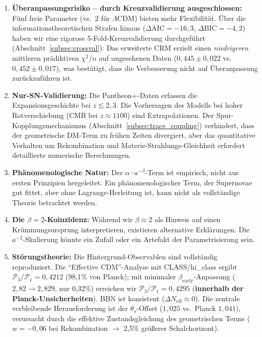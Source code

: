 \documentclass[aps,prd,twocolumn,superscriptaddress,nofootinbib]{revtex4-2}
\begin{document}
\begin{enumerate}
\item \textbf{\"Uberanpassungsrisiko -- durch Kreuzvalidierung ausgeschlossen:} F\"unf freie Parameter (vs.\ 2 f\"ur $\Lambda$CDM) bieten mehr Flexibilit\"at. \"Uber die informationstheoretischen Strafen hinaus ($\Delta\mathrm{AIC} = -16{,}3$, $\Delta\mathrm{BIC} = -4{,}2$) haben wir eine rigorose 5-Fold-Kreuzvalidierung durchgef\"uhrt (Abschnitt~\ref{subsec:crossval}): Das erweiterte CRM erzielt einen \textit{niedrigeren} mittleren pr\"adiktiven $\chi^2/n$ auf ungesehenen Daten ($0{,}445 \pm 0{,}022$ vs.\ $0{,}452 \pm 0{,}017$), was best\"atigt, dass die Verbesserung nicht auf \"Uberanpassung zur\"uckzuf\"uhren ist.

\item \textbf{Nur-SN-Validierung:} Die Pantheon+-Daten erfassen die Expansionsgeschichte bei $z \lesssim 2{,}3$. Die Vorhersagen des Modells bei hoher Rotverschiebung (CMB bei $z \approx 1100$) sind Extrapolationen. Der Spur-Kopplungsmechanismus (Abschnitt~\ref{subsec:trace_coupling}) verhindert, dass der geometrische DM-Term zu fr\"uhen Zeiten divergiert, aber das quantitative Verhalten um Rekombination und Materie-Strahlungs-Gleichheit erfordert detaillierte numerische Berechnungen.

\item \textbf{Ph\"anomenologische Natur:} Der $\alpha \cdot a^{-\beta}$-Term ist empirisch, nicht aus ersten Prinzipien hergeleitet. Ein ph\"anomenologischer Term, der Supernovae gut fittet, aber ohne Lagrange-Herleitung ist, kann nicht als vollst\"andige Theorie betrachtet werden.

\item \textbf{Die $\beta = 2$-Koinzidenz:} W\"ahrend wir $\beta \approx 2$ als Hinweis auf einen Kr\"ummungsursprung interpretieren, existieren alternative Erkl\"arungen. Die $a^{-2}$-Skalierung k\"onnte ein Zufall oder ein Artefakt der Parametrisierung sein.

\item \textbf{St\"orungstheorie:} Die Hintergrund-Observablen sind vollst\"andig reproduziert. Die "`Effective CDM"'-Analyse mit CLASS/hi\_class \cite{Lewis2000, Zumalacarregui2017} ergibt $\mathcal{P}_3/\mathcal{P}_1 = 0{,}4212$ (98{,}1\% von Planck); mit minimaler $\beta_{\mathrm{early}}$-Anpassung ($2{,}82 \to 2{,}829$, nur 0{,}32\%) erreichen wir $\mathcal{P}_3/\mathcal{P}_1 = 0{,}4295$ (\textbf{innerhalb der Planck-Unsicherheiten}). BBN ist konsistent ($\Delta N_{\mathrm{eff}} \approx 0$). Die zentrale verbleibende Herausforderung ist der $\theta_s$-Offset ($1{,}025$ vs.\ Planck $1{,}041$), verursacht durch die effektive Zustandsgleichung des geometrischen Terms ($w = -0{,}06$ bei Rekombination $\to$ 2{,}5\% größerer Schalchorizont).
\end{enumerate}
\end{document}
